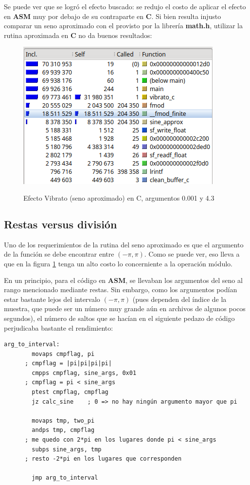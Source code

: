Se puede ver que se logró el efecto buscado: se redujo el costo de aplicar el efecto en \textbf{ASM} muy por debajo de su contraparte en \textbf{C}. Si bien resulta injusto comparar un seno aproximado con el provisto por la librería \textbf{math.h}, utilizar la rutina aproximada en \textbf{C} no da buenos resultados:

\begin{figure}[H]
    \centering
    \includegraphics[scale=0.8]{imagenes/callgrind-c-seno-approx.png}
    \label{fig:callgrind-asm-27512}
    \caption{Efecto Vibrato (seno aproximado) en C, argumentos 0.001 y 4.3}
\end{figure}


\subsection{Restas versus división}
\label{subsec:desarrollo-problemas-modulo}
Uno de los requerimientos de la rutina del seno aproximado es que el argumento de la función se debe encontrar entre $(-\pi,\pi)$. Como se puede ver, eso lleva a que en la figura \ref{fig:callgrind-asm-27512} tenga un alto costo lo concerniente a la operación módulo. 

En un principio, para el código en \textbf{ASM}, se llevaban los argumentos del seno al rango mencionado mediante restas. Sin embargo, como los argumentos podían estar bastante lejos del intervalo $(-\pi, \pi)$ (pues dependen del índice de la muestra, que puede ser un número muy grande aún en archivos de algunos pocos segundos), el número de saltos que se hacían en el siguiente pedazo de código perjudicaba bastante el rendimiento:\vspace{\baselineskip}

\lstset{language=[x86masm]Assembler}
\begin{lstlisting}[frame=single]
  arg_to_interval:
        movaps cmpflag, pi              
	  ; cmpflag = |pi|pi|pi|pi|
        cmpps cmpflag, sine_args, 0x01  
	  ; cmpflag = pi < sine_args
        ptest cmpflag, cmpflag
        jz calc_sine    ; 0 => no hay ningún argumento mayor que pi

        movaps tmp, two_pi
        andps tmp, cmpflag              
	  ; me quedo con 2*pi en los lugares donde pi < sine_args
        subps sine_args, tmp            
	  ; resto -2*pi en los lugares que corresponden

        jmp arg_to_interval
\end{lstlisting}

